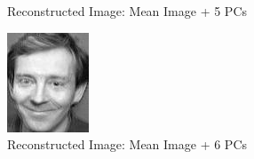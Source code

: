 \documentclass[12pt]{article}
\begin{document}
\begin{figure}
\begin{subfigure}[b]{0.20\textwidth}
		\caption{Reconstructed Image: Mean Image + 5 PCs}
	\end{subfigure}\quad
	\begin{subfigure}[b]{0.20\textwidth}
		\includegraphics[width=\textwidth]{Task4.3_Images/ReconstructedImage6.jpg}
		\caption{Reconstructed Image: Mean Image + 6 PCs}
	\end{subfigure}\quad
	\begin{subfigure}[b]{0.20\textwidth}

\end{subfigure}
\end{figure}
\end{document}
